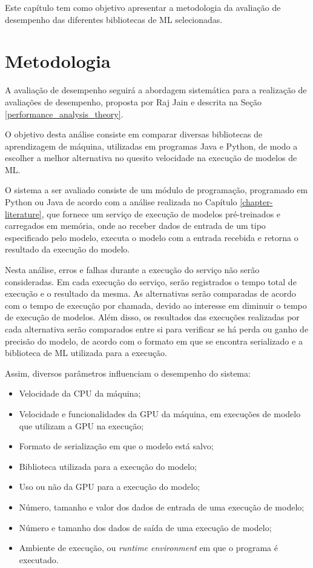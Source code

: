 Este capítulo tem como objetivo apresentar a metodologia da avaliação de desempenho das diferentes bibliotecas de ML selecionadas.

\section{Metodologia}

A avaliação de desempenho seguirá a abordagem sistemática para a realização de avaliações de desempenho, proposta por Raj Jain e descrita na Seção \ref{performance_analysis_theory}.

O objetivo desta análise consiste em comparar diversas bibliotecas de aprendizagem de máquina, utilizadas em programas Java e Python, de modo a escolher a melhor alternativa no quesito velocidade na execução de modelos de ML.

O sistema a ser avaliado consiste de um módulo de programação, programado em Python ou Java de acordo com a análise realizada no Capítulo \ref{chapter-literature}, que fornece um serviço de execução de modelos pré-treinados e carregados em memória, onde ao receber dados de entrada de um tipo especificado pelo modelo, executa o modelo com a entrada recebida e retorna o resultado da execução do modelo.

Nesta análise, erros e falhas durante a execução do serviço não serão consideradas. Em cada execução do serviço, serão registrados o tempo total de execução e o resultado da mesma. As alternativas serão comparadas de acordo com o tempo de execução por chamada, devido ao interesse em diminuir o tempo de execução de modelos. Além disso, os resultados das execuções realizadas por cada alternativa serão comparados entre si para verificar se há perda ou ganho de precisão do modelo, de acordo com o formato em que se encontra serializado e a biblioteca de ML utilizada para a execução.

Assim, diversos parâmetros influenciam o desempenho do sistema:

\begin{itemize}
    \item Velocidade da CPU da máquina;
    \item Velocidade e funcionalidades da GPU da máquina, em execuções de modelo que utilizam a GPU na execução;
    \item Formato de serialização em que o modelo está salvo;
    \item Biblioteca utilizada para a execução do modelo;
    \item Uso ou não da GPU para a execução do modelo;
    \item Número, tamanho e valor dos dados de entrada de uma execução de modelo;
    \item Número e tamanho dos dados de saída de uma execução de modelo;
    \item Ambiente de execução, ou \textit{runtime environment} em que o programa é executado.
\end{itemize}

